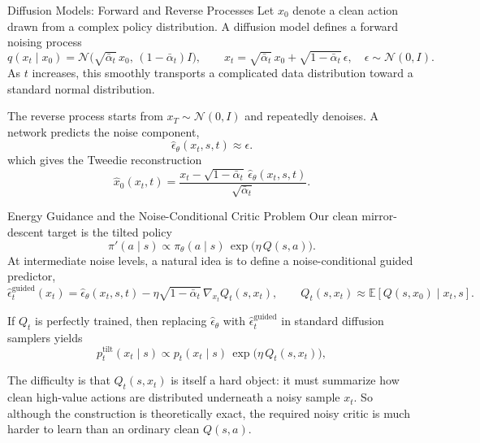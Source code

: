 \documentclass[aspectratio=169,11pt]{beamer}
\begin{document}
\begin{frame}{Diffusion Models: Forward and Reverse Processes}
\small
Let $x_0$ denote a clean action drawn from a complex policy distribution. A diffusion model defines a forward noising process
\[
q(x_t\mid x_0)=\mathcal{N}\!\bigl(\sqrt{\bar\alpha_t}\,x_0,\,(1-\bar\alpha_t)I\bigr),\qquad x_t=\sqrt{\bar\alpha_t}\,x_0+\sqrt{1-\bar\alpha_t}\,\epsilon,\quad \epsilon\sim\mathcal{N}(0,I).
\]
As $t$ increases, this smoothly transports a complicated data distribution toward a standard normal distribution.

\medskip
The reverse process starts from $x_T\sim\mathcal{N}(0,I)$ and repeatedly denoises. A network predicts the noise component,
\[
\hat\epsilon_\theta(x_t,s,t)\approx \epsilon.
\]
which gives the Tweedie reconstruction
\[
\hat x_0(x_t,t)=\frac{x_t-\sqrt{1-\bar\alpha_t}\,\hat\epsilon_\theta(x_t,s,t)}{\sqrt{\bar\alpha_t}}.
\]
\end{frame}

\begin{frame}{Energy Guidance and the Noise-Conditional Critic Problem}
\small
Our clean mirror-descent target is the tilted policy
\[
\pi'(a\mid s)\propto \pi_\theta(a\mid s)\,\exp\!\bigl(\eta\,Q(s,a)\bigr).
\]
At intermediate noise levels, a natural idea is to define a noise-conditional guided predictor,
\[
\hat\epsilon_t^{\mathrm{guided}}(x_t) = \hat\epsilon_\theta(x_t,s,t) - \eta\sqrt{1-\bar\alpha_t}\,\nabla_{x_t}Q_t(s,x_t),
\qquad
Q_t(s,x_t) \approx \mathbb{E}[Q(s,x_0)\mid x_t,s].
\]

\medskip
If $Q_t$ is perfectly trained, then replacing $\hat\epsilon_\theta$ with $\hat\epsilon_t^{\mathrm{guided}}$ in standard diffusion samplers yields
\[
p_t^{\mathrm{tilt}}(x_t\mid s)\propto p_t(x_t\mid s)\,\exp\!\bigl(\eta\,Q_t(s,x_t)\bigr),
\]

\medskip
The difficulty is that $Q_t(s,x_t)$ is itself a hard object: it must summarize how clean high-value actions are distributed underneath a noisy sample $x_t$. So although the construction is theoretically exact, the required noisy critic is much harder to learn than an ordinary clean $Q(s,a)$.
\end{frame}
\end{document}
